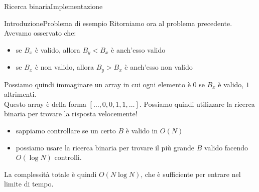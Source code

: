 \documentclass{beamer}
\begin{document}
\begin{frame}{Ricerca binaria}{Implementazione}
\end{frame}
%
\begin{frame}[t]{Introduzione}{Problema di esempio}
    Ritorniamo ora al problema precedente.
    Avevamo osservato che:
    \begin{itemize}
        \item se $B_x$ \`e valido, allora $B_y < B_x$ \`e anch'esso valido
        \item se $B_x$ \`e non valido, allora $B_y > B_x$ \`e anch'esso non valido
    \end{itemize}
    \pause
    Possiamo quindi immaginare un array in cui ogni elemento \`e $0$ se $B_x$ \`e valido, $1$ altrimenti.\\
    \pause
    Questo array è della forma $[\dots, 0, 0, 1, 1, \dots]$.
    \pause
    Possiamo quindi utilizzare la ricerca binaria per trovare la risposta velocemente!
    \pause
    \begin{itemize}
        \item sappiamo controllare se un certo $B$ \`e valido in $O(N)$
        \pause
        \item possiamo usare la ricerca binaria per trovare il pi\`u grande $B$ valido facendo $O(\log N)$ controlli.
    \end{itemize}
    La complessità totale \`e quindi $O(N \log N)$, che \`e sufficiente per entrare nel limite di tempo.    
\end{frame}
\end{document}
